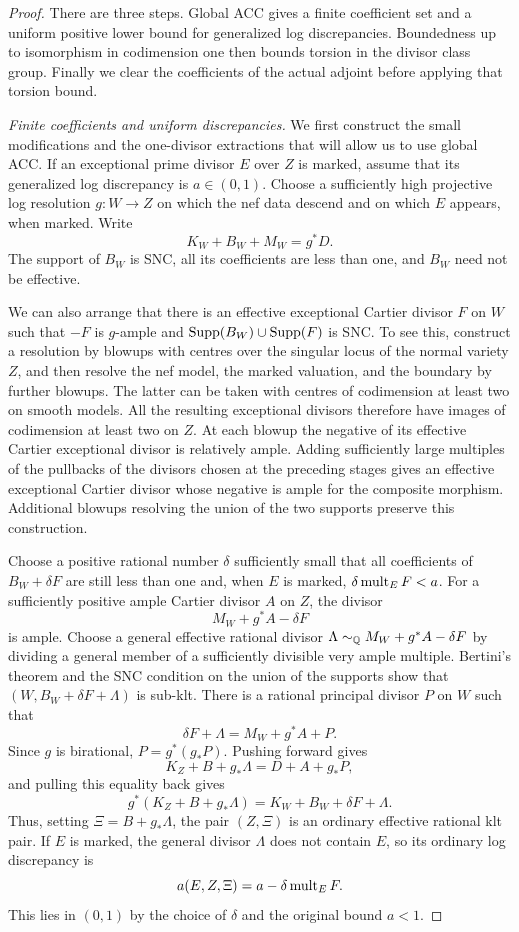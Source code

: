 \begin{proof}
There are three steps. Global ACC gives a finite coefficient set and
a uniform positive lower bound for generalized log discrepancies.
Boundedness up to isomorphism in codimension one then bounds torsion
in the divisor class group. Finally we clear the coefficients of the
actual adjoint before applying that torsion bound.

\smallskip
\noindent\emph{Finite coefficients and uniform discrepancies.}
We first construct the small modifications and the one-divisor extractions
that will allow us to use global ACC.  If an exceptional prime divisor $E$
over $Z$ is marked, assume that its generalized log discrepancy is
$a\in(0,1)$.  Choose a sufficiently high projective log resolution
$g:W\to Z$ on which the nef data descend and on which $E$ appears, when
marked.  Write
\[
 K_W+B_W+M_W=g^*D.
\]
The support of $B_W$ is SNC, all its coefficients are less than one, and
$B_W$ need not be effective.

We can also arrange that there is an effective exceptional Cartier divisor
$F$ on $W$ such that $-F$ is $g$-ample and
$\operatorname{Supp}(B_W)\cup\operatorname{Supp}(F)$ is SNC.  To see this, construct a resolution by
blowups with centres over the singular locus of the normal variety $Z$, and
then resolve the nef model, the marked valuation, and the boundary by further
blowups.
The latter can be taken with centres of codimension at least two on smooth
models.  All the resulting exceptional divisors therefore have images of
codimension at least two on $Z$.  At each blowup the negative of its
effective Cartier exceptional divisor is relatively ample.  Adding
sufficiently large multiples of the pullbacks of the divisors chosen at the
preceding stages gives an effective exceptional Cartier divisor whose
negative is ample for the composite morphism.  Additional blowups resolving
the union of the two supports preserve this construction.

Choose a positive rational number $\delta$ sufficiently small that all
coefficients of $B_W+\delta F$ are still less than one and, when $E$ is
marked, $\delta\operatorname{mult}_E F<a$.  For a sufficiently positive ample Cartier
divisor $A$ on $Z$, the divisor
\[
 M_W+g^*A-\delta F
\]
is ample.  Choose a general effective rational divisor
$\Lambda\sim_{\mathbb Q}M_W+g^*A-\delta F$ by dividing a general member of a
sufficiently divisible very ample multiple.  Bertini's theorem and the SNC
condition on the union of the supports show that
$(W,B_W+\delta F+\Lambda)$ is sub-klt.
There is a rational principal divisor $P$ on $W$ such that
\[
 \delta F+\Lambda=M_W+g^*A+P.
\]
Since $g$ is birational, $P=g^*(g_*P)$.  Pushing forward gives
\[
 K_Z+B+g_*\Lambda=D+A+g_*P,
\]
and pulling this equality back gives
\[
 g^*(K_Z+B+g_*\Lambda)
       =K_W+B_W+\delta F+\Lambda.
\]
Thus, setting $\Xi=B+g_*\Lambda$, the pair $(Z,\Xi)$ is an ordinary
effective rational klt pair.  If $E$ is marked, the general divisor
$\Lambda$ does not contain $E$, so its ordinary log discrepancy is
\[
 a(E,Z,\Xi)=a-\delta\operatorname{mult}_E F.
\]
This lies in $(0,1)$ by the choice of $\delta$ and the original bound $a<1$.


\end{proof}
